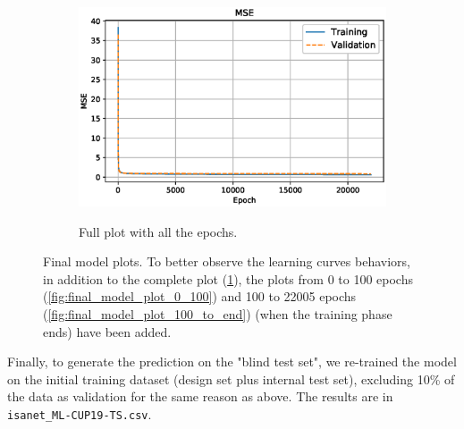\documentclass[11pt]{article}
\begin{document}
\begin{figure}[H]
\begin{subfigure}[b]{0.45\textwidth}
{              \includegraphics{Images/final_model/model_7_all.eps}
                    }
         \caption{Full plot with all the epochs.}
         \label{fig:final_model_plot_all}
     \end{subfigure}
\caption{Final model plots. To better observe the learning curves behaviors, in addition to the complete plot (\ref{fig:final_model_plot_all}), the plots from 0 to 100 epochs (\ref{fig:final_model_plot_0_100}) and 100 to 22005 epochs (\ref{fig:final_model_plot_100_to_end}) (when the training phase ends) have been added.}
     \label{fig:final_model_plot}
\end{figure}
Finally, to generate the prediction on the "blind test set", we re-trained the model on the initial training dataset (design set plus internal test set), excluding 10\% of the data as validation for the same reason as above. The results are in \texttt{isanet\_ML-CUP19-TS.csv}.
\end{document}
